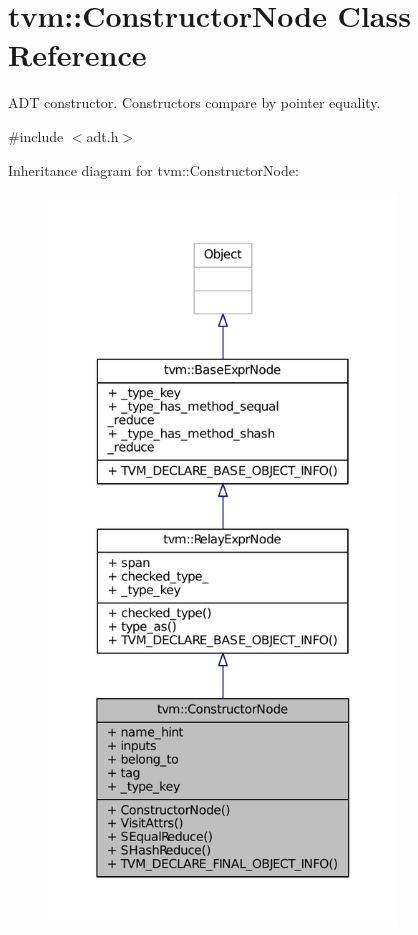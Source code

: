 \hypertarget{classtvm_1_1ConstructorNode}{}\section{tvm\+:\+:Constructor\+Node Class Reference}
\label{classtvm_1_1ConstructorNode}


A\+DT constructor. Constructors compare by pointer equality.  




{\ttfamily \#include $<$adt.\+h$>$}



Inheritance diagram for tvm\+:\+:Constructor\+Node\+:
\nopagebreak
\begin{figure}[H]
\begin{center}
\leavevmode
\includegraphics[height=550pt]{classtvm_1_1ConstructorNode__inherit__graph}
\end{center}
\end{figure}


